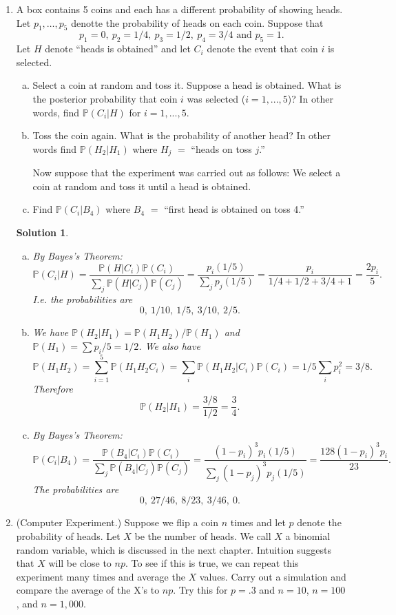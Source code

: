 \documentclass[10pt]{article}
\newtheorem*{sol}{Solution}
\renewcommand{\P}{\mathbb{P}}
\begin{document}
\begin{enumerate}
\item[(20)] A box contains 5 coins and each has a different probability of
showing heads. Let $p_1,\ldots, p_5$ denotte the probability of heads on each
coin. Suppose that
\[
p_1=0, \ p_2=1/4, \ p_3 =1/2, \ p_4=3/4 \text{ and } p_5=1.
\]
Let $H$ denote ``heads is obtained'' and let $C_i$ denote the event that
coin $i$ is selected.
\begin{enumerate}[(a)]
\item Select a coin at random and toss it. Suppose a head is obtained.
What is the posterior probability that coin $i$ was selected
($i = 1, ... , 5$)?
In other words, find $\P(C_i|H)$ for $i = 1, ... ,5$.
\item Toss the coin again. What is the probability of another head? In
other words find $\P(H_2|H_1)$ where $H_j$ $=$ ``heads on toss $j$.''

Now suppose that the experiment was carried out as follows: We select
a coin at random and toss it until a head is obtained.
\item Find $\P(C_i|B_4)$ where $B_4$ $=$ ``first head is obtained
on toss 4.''
\end{enumerate}

\begin{sol}
\begin{enumerate}[(a)]
\item By Bayes's Theorem:
\[
\P(C_i | H) = \frac{\P(H|C_i)\P(C_i)}{\sum_j \P(H | C_j)\P(C_j)}=
\frac{p_i(1/5)}{\sum_j p_j(1/5)}=\frac{p_i}{1/4+1/2+3/4+1} = \frac{2p_i}{5}.
\]
I.e. the probabilities are
\[
0, \ 1/10, \ 1/5, \ 3/10, \ 2/5.
\]
\item We have $\P(H_2|H_1)=\P(H_1H_2)/\P(H_1)$ and $\P(H_1)=\sum p_i/5 =1/2$.
We also have
\[
\P(H_1H_2) = \sum_{i=1}^5 \P(H_1H_2C_i) = \sum_i \P(H_1H_2|C_i)\P(C_i)
=1/5 \sum_i p_i^2 =3/8.
\]
Therefore
\[
\P(H_2|H_1) = \frac{3/8}{1/2} = \frac{3}{4}.
\]
\item By Bayes's Theorem:
\[
\P(C_i|B_4)= \frac{\P(B_4|C_i)\P(C_i)}{\sum_j \P(B_4|C_j)\P(C_j)}
=\frac{(1-p_i)^3p_i(1/5)}{\sum_j(1-p_j)^3p_j(1/5)} =
\frac{128(1-p_i)^3p_i}{23}.
\]
The probabilities are
\[
0, \ 27/46, \ 8/23, \ 3/46, \ 0.
\]
\end{enumerate}
\end{sol}

\item[(22)] (Computer Experiment.) Suppose we flip a coin $n$ times and let $p$
denote the probability of heads. Let $X$ be the number of heads. We call $X$
a binomial random variable, which is discussed in the next chapter.
Intuition suggests that $X$ will be close to $np$. To see if this is true, we
can repeat this experiment many times and average the $X$ values. Carry
out a simulation and compare the average of the X's to $np$. Try this for
$p =.3$ and $n = 10$, $n = 100$, and $n = 1,000$.


\end{enumerate}
\end{document}
